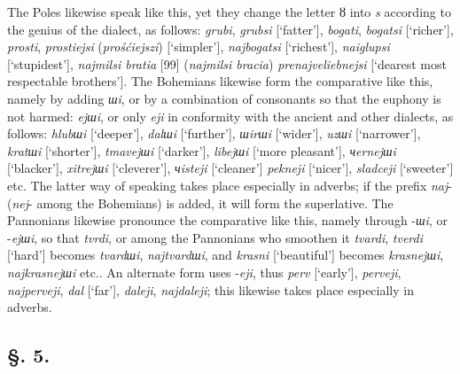 The Poles likewise speak like this, yet they change the letter ȣ into \textit{s} according to the genius of the dialect, as follows: \textit{grubi}, \textit{grubsi} [‘fatter’], \textit{bogati}, \textit{bogatsi} [‘richer’], \textit{prosti}, \textit{prostiejsi} (\textit{prośćiejszi}) [‘simpler’], \textit{najbogatsi} [‘richest’], \textit{naiglupsi} [‘stupidest’], \textit{najmilsi bratia} [99] (\textit{najmilsi bracia}) \textit{prenajveliebnejsi} [‘dearest \linebreak{} most respectable brothers’]. The Bohemians likewise form the comparative like this, namely by adding \textit{шi}, or by a combination of consonants so that the euphony is not harmed: \textit{ejшi}, or only \textit{eji} in conformity with the ancient and other dialects, as follows: \textit{hlubшi} [‘deeper’], \textit{dalшi} [‘further’], \textit{шirшi} [‘wider’], \textit{uzшi} [‘narrower’], \textit{kratшi} [‘shorter’], \textit{tmavejшi} [‘darker’], \textit{libejшi} [‘more pleasant’], \textit{чernejшi} [‘blacker’], \textit{xitrejшi} [‘cleverer’], \textit{чisteji} [‘cleaner’] \textit{pekneji} [‘nicer’], \textit{sladceji} [‘sweeter’] etc. The latter way of speaking takes place especially in adverbs; if the prefix \textit{naj}- (\textit{nej}- among the Bohemians) is added, it will form the superlative. The Pannonians likewise pronounce the comparative like this, namely through -\textit{шi}, or -\textit{ejшi}, so that \textit{tvrdi}, or among the Pannonians who smoothen it \textit{tvardi}, \textit{tverdi} [‘hard’] becomes \textit{tvardшi}, \textit{najtvardшi}, and \textit{krasni} [‘beautiful’] becomes \textit{krasnejшi}, \textit{najkrasnejшi} etc.. An alternate form uses -\textit{eji}, thus \textit{perv} [‘early’], \textit{perveji}, \textit{najperveji}, \textit{dal} [‘far’], \textit{daleji}, \textit{najdaleji}; this likewise takes place especially in adverbs.

\subsection*{\hspace*{\fill}§. 5.\hspace*{\fill}}

